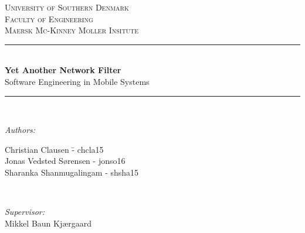 \begin{titlepage}
\newcommand{\HRule}{\rule{\linewidth}{0.5mm}} %

\center %
 

\textsc{\LARGE University of Southern Denmark}\\[1.5cm] 
\textsc{\Large Faculty of Engineering}\\[0.5cm]
\textsc{\large Maersk Mc-Kinney Moller Insitute}\\[0.5cm] 


\HRule \\[0.4cm]
{ \huge \bfseries Yet Another Network Filter}\\[0.4cm]
{\large  Software Engineering in Mobile Systems}
\HRule \\[1.5cm]
 



\begin{minipage}{0.4\textwidth}
    \begin{flushleft} \large
        \emph{Authors:}\\
        \begin{tabbing}
        
        Christian Clausen \hphantom{zzzzzzzzz} \=- chcla15\\
        Jonas Vedsted Sørensen \>- jonso16\\
        Sharanka Shanmugalingam \>- shsha15\\

        \end{tabbing}
        
    \end{flushleft}
\end{minipage}~
\begin{minipage}{0.4\textwidth}
    \begin{flushright} \large
        \emph{Supervisor:} \\
        Mikkel Baun Kjærgaard 
        

\end{flushright}
\end{minipage}
\end{titlepage}
